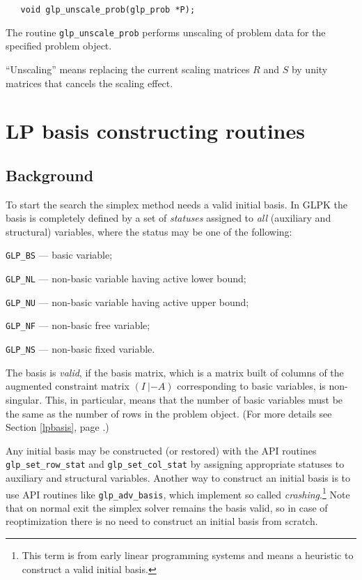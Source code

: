 \vspace*{-4pt}

\synopsis

\begin{verbatim}
   void glp_unscale_prob(glp_prob *P);
\end{verbatim}

The routine \verb|glp_unscale_prob| performs unscaling of problem data
for the specified problem object.

``Unscaling'' means replacing the current scaling matrices $R$ and $S$
by unity matrices that cancels the scaling effect.


\newpage

\section{LP basis constructing routines}

\subsection{Background}

To start the search the simplex method needs a valid initial basis.
In GLPK the basis is completely defined by a set of {\it statuses}
assigned to {\it all} (auxiliary and structural) variables, where the
status may be one of the following:

\verb|GLP_BS| --- basic variable;

\verb|GLP_NL| --- non-basic variable having active lower bound;

\verb|GLP_NU| --- non-basic variable having active upper bound;

\verb|GLP_NF| --- non-basic free variable;

\verb|GLP_NS| --- non-basic fixed variable.

The basis is {\it valid}, if the basis matrix, which is a matrix built
of columns of the augmented constraint matrix $(I\:|-A)$ corresponding
to basic variables, is non-singular. This, in particular, means that
the number of basic variables must be the same as the number of rows in
the problem object. (For more details see Section \ref{lpbasis}, page
\pageref{lpbasis}.)

Any initial basis may be constructed (or restored) with the API
routines \verb|glp_set_row_stat| and \verb|glp_set_col_stat| by
assigning appropriate statuses to auxiliary and structural variables.
Another way to construct an initial basis is to use API routines like
\verb|glp_adv_basis|, which implement so called
{\it crashing}.\footnote{This term is from early linear programming
systems and means a heuristic to construct a valid initial basis.} Note
that on normal exit the simplex solver remains the basis valid, so in
case of reoptimization there is no need to construct an initial basis
from scratch.

